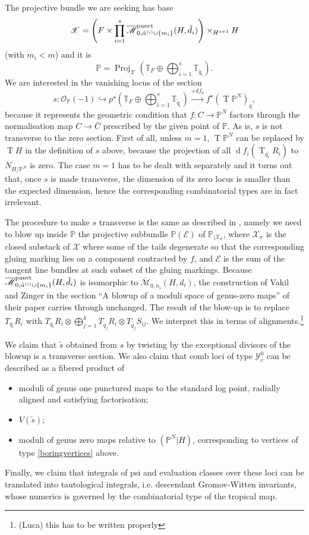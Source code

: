 \documentclass[11pt]{amsart}
\newcommand{\oM}{\overline{\mathcal{M}}}
\newcommand{\M}[4]{\overline{\mathcal{M}}_{#1,#2}(#3,#4)}
\newcommand{\PP}{\mathbb P}
\newcommand{\st}{\star}
\newcommand{\OO}{\mathcal{O}}
\renewcommand{\to}{\rightarrow}
\newcommand{\Proj}{\operatorname{Proj}}
\theoremstyle{definition}
\theoremstyle{definition}
\begin{document}
The projective bundle we are seeking has base
\[\mathcal X=\left(F\times \prod_{i=1}^s\oM_{0,\tilde\alpha^{(i)}\cup\{m_i\}}^{\rm{punct}}(H,\tilde d_i)\right)\times_{H^{s+1}}H\]
(with $m_i<m$) and it is \[\PP=\Proj_{\mathcal X}\left(\mathbb T_F\oplus\bigoplus_{i=1}^s\mathbb T_{\tilde q_i}\right).\]
We are interested in the vanishing locus of the section
\[s\colon\OO_{\PP}(-1)\hookrightarrow p^\st\left(\mathbb T_F\oplus\bigoplus_{i=1}^s\mathbb T_{\tilde q_i}\right)\xrightarrow{+df_q} f^\st(\operatorname{T}\PP^N)_q,\]
because it represents the geometric condition that $f\colon C\to \PP^N$ factors through the normalisation map $C\to\bar C$ prescribed by the given point of $\PP$. As is, $s$ is not transverse to the zero section. First of all, unless $m=1$, $\operatorname{T}\PP^N$ can be replaced by $\operatorname{T}H$ in the definition of $s$ above, because the projection of all $\operatorname{d}f_i(\operatorname{T}_{q_i}R_i)$ to $N_{H/\PP^N}$ is zero. The case $m=1$ has to be dealt with separately and it turns out that, once $s$ is made transverse, the dimension of its zero locus is smaller than the expected dimension, hence the corresponding combinatorial types are in fact irrelevant.

The procedure to make $s$ transverse is the same as described in \cite[\S 3]{VZ}, namely we need to blow up inside $\PP$ the projective subbundle $\PP(\mathcal E)$ of $\PP_{|\mathcal X_\sigma}$, where $\mathcal X_\sigma$ is the closed substack of $\mathcal X$ where some of the tails degenerate so that the corresponding gluing marking lies on a component contracted by $f$, and $\mathcal E$ is the sum of the tangent line bundles at such subset of the gluing markings. Because $\oM_{0,\tilde\alpha^{(i)}\cup\{m_i\}}^{\rm{punct}}(H,\tilde d_i)$ is isomorphic to $\M{0}{\tilde n_i}{H}{d_i}$, the construction of Vakil and Zinger in the section ``A blowup of a moduli space of genus-zero maps'' of their paper carries through unchanged. The result of the blow-up is to replace $T_{q_i}R_i$ with $T_{q_i}R_i\otimes\bigoplus_{j=1}^kT_{\tilde q_j}R_i\otimes T_{\tilde q_j} S_{ij}$. We interpret this in terms of alignments.\footnote{(Luca) this has to be written properly}

We claim that $\tilde s$ obtained from $s$ by twisting by the exceptional divisors of the blowup is a transverse section. We also claim that comb loci of type $\mathcal Y_c^0$ can be described as a fibered product of 
\begin{itemize}
 \item moduli of genus one punctured maps to the standard log point, radially aligned and satisfying factorisation;
 \item $V(\tilde s)$;
 \item moduli of genus zero maps relative to $(\PP^N|H)$, corresponding to vertices of type \ref{boringvertices} above.
\end{itemize}
Finally, we claim that integrals of psi and evaluation classes over these loci can be translated into tautological integrals, i.e. descendant Gromov-Witten invariants, whose numerics is governed by the combinatorial type of the tropical map.
\end{document}
